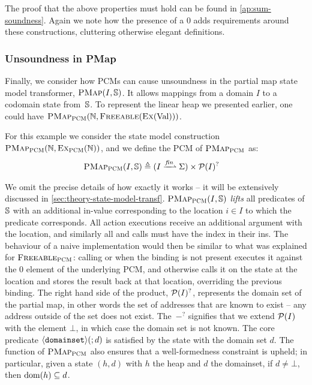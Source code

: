 The proof that the above properties must hold can be found in \cref{ap:sum-soundness}. Again we note how the presence of a $0$ adds requirements around these constructions, cluttering otherwise elegant definitions.

\subsubsection{Unsoundness in PMap}

Finally, we consider how PCMs can cause unsoundness in the partial map state model transformer, $\textsc{PMap}(I, \mathbb S)$. It allows mappings from a domain $I$ to a codomain state from~$\mathbb S$. To represent the linear heap we presented earlier, one could have $\textsc{PMap}_{\textsc{PCM}}(\mathbb N, \textsc{Freeable}(\textsc{Ex}(\text{Val})))$. 

For this example we consider the state model construction $\textsc{PMap}_{\textsc{PCM}}(\mathbb N, \textsc{Ex}_{\textsc{PCM}}(\mathbb N))$, and we define the PCM of $\textsc{PMap}_{\textsc{PCM}}$ as: \begin{align*}
	\PMap_\PCM(I, \mmdl) &\defeq (I \finmap \St) \times \pset(I)^?
\end{align*}

We omit the precise details of how exactly it works -- it will be extensively discussed in \cref{sec:theory-state-model-transf}. $\textsc{PMap}_{\textsc{PCM}}(I,\mathbb S)$ \emph{lifts} all predicates of $\mathbb S$ with an additional in-value corresponding to the location $i\in I$ to which the predicate corresponds. All action executions receive an additional argument with the location, and similarly all \consume{} and \produce{} calls must have the index in their ins. The behaviour of a naive implementation would then be similar to what was explained for $\textsc{Freeable}_{\textsc{PCM}}$: calling \consume{} or \produce{} when the binding is not present executes it against the $0$ element of the underlying PCM, and otherwise calls it on the state at the location and stores the result back at that location, overriding the previous binding. The right hand side of the product, ${\cal P}(I)^?$, represents the domain set of the partial map, in other words the set of addresses that are known to exist -- any address outside of the set does not exist. The~$-^?$ signifies that we extend ${\cal P}(I)$ with the element $\bot$, in which case the domain set is not known. The core predicate $\left<\texttt{domainset}\right>\!(;d)$ is satisfied by the state with the domain set $d$. The \produce{} function of $\textsc{PMap}_{\textsc{PCM}}$ also ensures that a well-formedness constraint is upheld; in particular, given a state $(h,d)$ with $h$ the heap and $d$ the domainset, if $d\neq\bot$, then $\operatorname{dom}(h)\subseteq d$.

